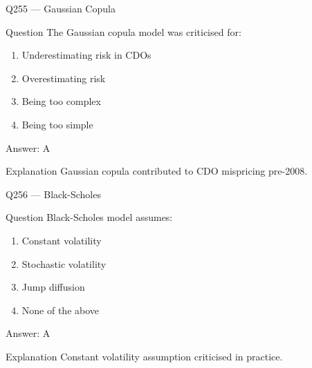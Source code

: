 \documentclass[aspectratio=169,8pt]{beamer}
\begin{document}
								\begin{frame}{Q255 --- Gaussian Copula}
									\begin{block}{Question}
										The Gaussian copula model was criticised for:
										\begin{enumerate}
											\item Underestimating risk in CDOs
											\item Overestimating risk
											\item Being too complex
											\item Being too simple
										\end{enumerate}
									\end{block}
									\begin{exampleblock}{Answer: A}\end{exampleblock}
									\begin{block}{Explanation}
										Gaussian copula contributed to CDO mispricing pre-2008.
									\end{block}
								\end{frame}
								
								\begin{frame}{Q256 --- Black-Scholes}
									\begin{block}{Question}
										Black-Scholes model assumes:
										\begin{enumerate}
											\item Constant volatility
											\item Stochastic volatility
											\item Jump diffusion
											\item None of the above
										\end{enumerate}
									\end{block}
									\begin{exampleblock}{Answer: A}\end{exampleblock}
									\begin{block}{Explanation}
										Constant volatility assumption criticised in practice.
									\end{block}
								\end{frame}
								
\end{document}

